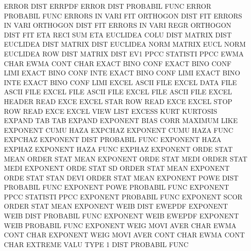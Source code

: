 ERROR    DIST                           ERRPDF
ERROR    DIST                           PROBABIL FUNC
ERROR                                   PROBABIL FUNC
ERRORS   IN   VARI FIT                  ORTHOGON DIST FIT
ERRORS   IN   VARI                      ORTHOGON DIST FIT
ERRORS   IN   VARI REGR                 ORTHOGON DIST FIT
ETA      RECI SUM                       ETA
EUCLIDEA COLU DIST                      MATRIX   DIST
EUCLIDEA DIST                           MATRIX   DIST
EUCLIDEA NORM                           MATRIX   EUCL NORM
EUCLIDEA ROW  DIST                      MATRIX   DIST
EV1      PPCC                           STATISTI PPCC
EWMA     CHAR                           EWMA     CONT CHAR
EXACT    BINO CONF                      EXACT    BINO CONF LIMI
EXACT    BINO CONF INTE                 EXACT    BINO CONF LIMI
EXACT    BINO INTE                      EXACT    BINO CONF LIMI
EXCEL                                   ASCII    FILE
EXCEL    DATA FILE                      ASCII    FILE
EXCEL    FILE                           ASCII    FILE
EXCEL    FILE                           ASCII    FILE
EXCEL    HEADER                         READ     EXCE
EXCEL    STAR ROW                       READ     EXCE
EXCEL    STOP ROW                       READ     EXCE
EXCEL    VIEW                           LIST
EXCESS   KURT                           KURTOSIS
EXPAND   TAB                            TAB      EXPAND
EXPONENT BIAS CORR                      MAXIMUM  LIKE
EXPONENT CUMU HAZA                      EXPCHAZ
EXPONENT CUMU HAZA FUNC                 EXPCHAZ
EXPONENT DIST                           PROBABIL FUNC
EXPONENT HAZA                           EXPHAZ
EXPONENT HAZA FUNC                      EXPHAZ
EXPONENT ORDE STAT MEAN                 ORDER    STAT MEAN
EXPONENT ORDE STAT MEDI                 ORDER    STAT MEDI
EXPONENT ORDE STAT SD                   ORDER    STAT MEAN
EXPONENT ORDE STAT STAN DEVI            ORDER    STAT MEAN
EXPONENT POWE DIST                      PROBABIL FUNC
EXPONENT POWE                           PROBABIL FUNC
EXPONENT PPCC                           STATISTI PPCC
EXPONENT                                PROBABIL FUNC
EXPONENT SCOR                           ORDER    STAT MEAN
EXPONENT WEIB DIST                      EWEPDF
EXPONENT WEIB DIST                      PROBABIL FUNC
EXPONENT WEIB                           EWEPDF
EXPONENT WEIB                           PROBABIL FUNC
EXPONENT WEIG MOVI AVER CHAR            EWMA     CONT CHAR
EXPONENT WEIG MOVI AVER CONT CHAR       EWMA     CONT CHAR
EXTREME  VALU TYPE 1    DIST            PROBABIL FUNC

